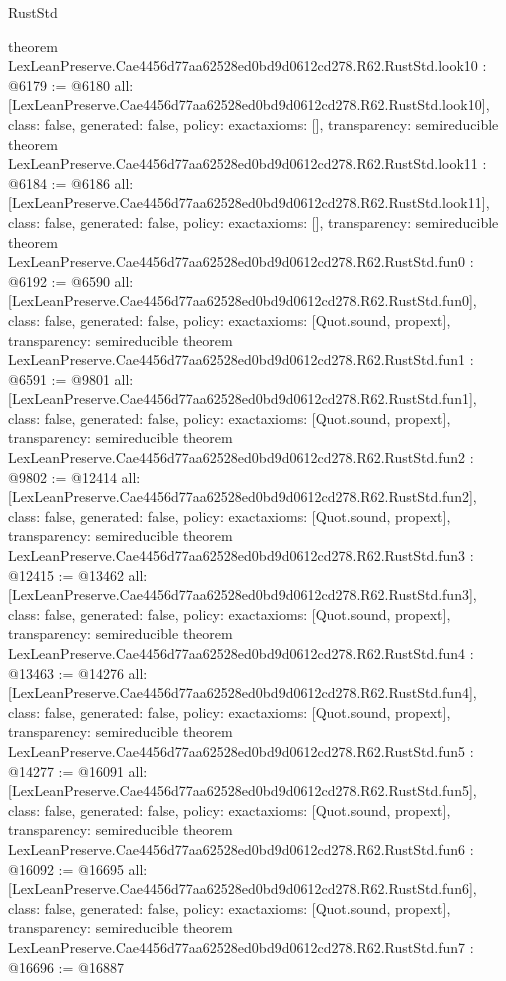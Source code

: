 \begin{lexlean}{RustStd}
\begin{coremodule}
{}
theorem LexLeanPreserve.Cae4456d77aa62528ed0bd9d0612cd278.R62.RustStd.look10 : @6179 := @6180 {
  all: [LexLeanPreserve.Cae4456d77aa62528ed0bd9d0612cd278.R62.RustStd.look10],
  class: false,
  generated: false,
  policy: exact{axioms: []},
  transparency: semireducible
}
theorem LexLeanPreserve.Cae4456d77aa62528ed0bd9d0612cd278.R62.RustStd.look11 : @6184 := @6186 {
  all: [LexLeanPreserve.Cae4456d77aa62528ed0bd9d0612cd278.R62.RustStd.look11],
  class: false,
  generated: false,
  policy: exact{axioms: []},
  transparency: semireducible
}
theorem LexLeanPreserve.Cae4456d77aa62528ed0bd9d0612cd278.R62.RustStd.fun0 : @6192 := @6590 {
  all: [LexLeanPreserve.Cae4456d77aa62528ed0bd9d0612cd278.R62.RustStd.fun0],
  class: false,
  generated: false,
  policy: exact{axioms: [Quot.sound, propext]},
  transparency: semireducible
}
theorem LexLeanPreserve.Cae4456d77aa62528ed0bd9d0612cd278.R62.RustStd.fun1 : @6591 := @9801 {
  all: [LexLeanPreserve.Cae4456d77aa62528ed0bd9d0612cd278.R62.RustStd.fun1],
  class: false,
  generated: false,
  policy: exact{axioms: [Quot.sound, propext]},
  transparency: semireducible
}
theorem LexLeanPreserve.Cae4456d77aa62528ed0bd9d0612cd278.R62.RustStd.fun2 : @9802 := @12414 {
  all: [LexLeanPreserve.Cae4456d77aa62528ed0bd9d0612cd278.R62.RustStd.fun2],
  class: false,
  generated: false,
  policy: exact{axioms: [Quot.sound, propext]},
  transparency: semireducible
}
theorem LexLeanPreserve.Cae4456d77aa62528ed0bd9d0612cd278.R62.RustStd.fun3 : @12415 := @13462 {
  all: [LexLeanPreserve.Cae4456d77aa62528ed0bd9d0612cd278.R62.RustStd.fun3],
  class: false,
  generated: false,
  policy: exact{axioms: [Quot.sound, propext]},
  transparency: semireducible
}
theorem LexLeanPreserve.Cae4456d77aa62528ed0bd9d0612cd278.R62.RustStd.fun4 : @13463 := @14276 {
  all: [LexLeanPreserve.Cae4456d77aa62528ed0bd9d0612cd278.R62.RustStd.fun4],
  class: false,
  generated: false,
  policy: exact{axioms: [Quot.sound, propext]},
  transparency: semireducible
}
theorem LexLeanPreserve.Cae4456d77aa62528ed0bd9d0612cd278.R62.RustStd.fun5 : @14277 := @16091 {
  all: [LexLeanPreserve.Cae4456d77aa62528ed0bd9d0612cd278.R62.RustStd.fun5],
  class: false,
  generated: false,
  policy: exact{axioms: [Quot.sound, propext]},
  transparency: semireducible
}
theorem LexLeanPreserve.Cae4456d77aa62528ed0bd9d0612cd278.R62.RustStd.fun6 : @16092 := @16695 {
  all: [LexLeanPreserve.Cae4456d77aa62528ed0bd9d0612cd278.R62.RustStd.fun6],
  class: false,
  generated: false,
  policy: exact{axioms: [Quot.sound, propext]},
  transparency: semireducible
}
theorem LexLeanPreserve.Cae4456d77aa62528ed0bd9d0612cd278.R62.RustStd.fun7 : @16696 := @16887 {
}
\end{coremodule}
\end{lexlean}
